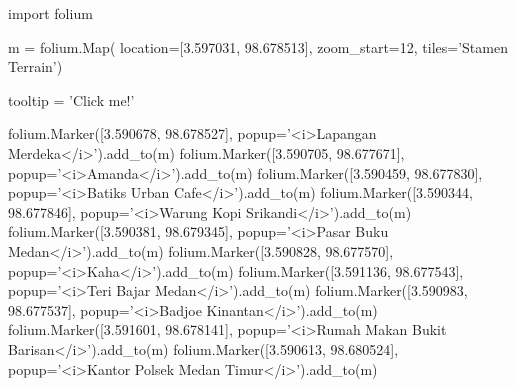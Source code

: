 import folium 

m = folium.Map(
location=[3.597031, 98.678513],
zoom_start=12,
tiles='Stamen Terrain')

tooltip = 'Click me!'

folium.Marker([3.590678, 98.678527], popup='<i>Lapangan Merdeka</i>').add_to(m)
folium.Marker([3.590705, 98.677671], popup='<i>Amanda</i>').add_to(m)
folium.Marker([3.590459, 98.677830], popup='<i>Batiks Urban Cafe</i>').add_to(m)
folium.Marker([3.590344, 98.677846], popup='<i>Warung Kopi Srikandi</i>').add_to(m)
folium.Marker([3.590381, 98.679345], popup='<i>Pasar Buku Medan</i>').add_to(m)
folium.Marker([3.590828, 98.677570], popup='<i>Kaha</i>').add_to(m)
folium.Marker([3.591136, 98.677543], popup='<i>Teri Bajar Medan</i>').add_to(m)
folium.Marker([3.590983, 98.677537], popup='<i>Badjoe Kinantan</i>').add_to(m)
folium.Marker([3.591601, 98.678141], popup='<i>Rumah Makan Bukit Barisan</i>').add_to(m)
folium.Marker([3.590613, 98.680524], popup='<i>Kantor Polsek Medan Timur</i>').add_to(m)